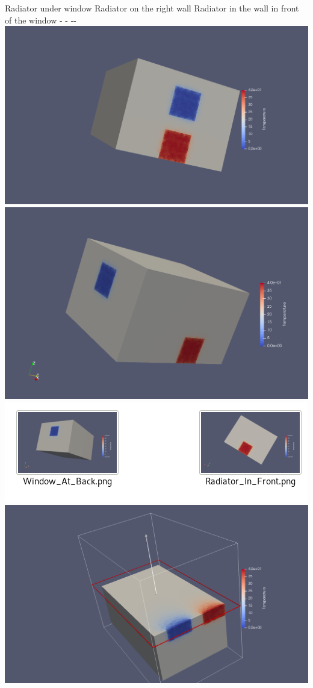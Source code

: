 \documentclass[11pt]{article}
\makeatletter
\def\maxwidth{\ifdim\Gin@nat@width>\linewidth\linewidth
    \else\Gin@nat@width\fi}
\let\Oldincludegraphics\includegraphics
\renewcommand{\includegraphics}[1]{\Oldincludegraphics[width=.8\maxwidth]{#1}}
\makeatother
\begin{document}
Radiator under window\textbar{} Radiator on the right wall \textbar{}
Radiator in the wall in front of the window - \textbar{} - -\textbar{}-
\includegraphics{FVTetra147655.png} \textbar{}
\includegraphics{ResultDroiteTetra.png} \textbar{}
\includegraphics{TetraDevant.png}
\includegraphics{ClipFVTetra147655.png} \textbar{}
\end{document}
